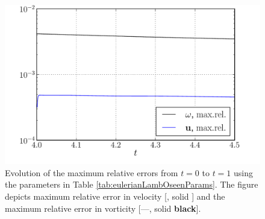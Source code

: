 	\begin{figure}[p]
	\centering
	\includegraphics[width=0.6\linewidth]{./figures/eulerian/lambOseen_eulerian_wRelEvolution_compressed.pdf}
	\caption{Evolution of the maximum relative errors from $t=0$ to $t=1$ using the parameters in Table \ref{tab:eulerianLambOseenParams}. The figure depicts maximum relative error in velocity [{\color{plotBlue}{---}}, solid {}] and the maximum relative error in vorticity [---, solid \textbf{black}]. }
	\label{fig:lambOseen_eulerian_wRelEvolution}
	\end{figure}


